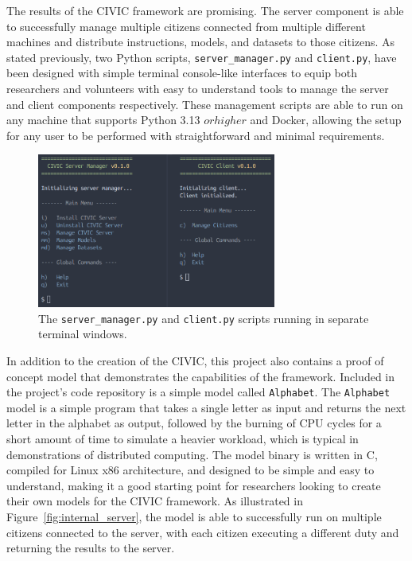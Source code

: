 \documentclass[11pt]{article}
\begin{document}
The results of the CIVIC framework are promising. The server component is able to successfully manage multiple citizens connected from multiple different machines and distribute instructions, models, and datasets to those citizens. As stated previously, two Python scripts, \verb|server_manager.py| and \verb|client.py|, have been designed with simple terminal console-like interfaces to equip both researchers and volunteers with easy to understand tools to manage the server and client components respectively. These management scripts are able to run on any machine that supports Python 3.13 \(or higher\) and Docker, allowing the setup for any user to be performed with straightforward and minimal requirements.

\begin{figure}[h]
    \centering
    \includegraphics[width=0.7\textwidth]{./figures/terminals.png}
    \caption{\small The \texttt{server\_manager.py} and \texttt{client.py} scripts running in separate terminal windows.}\label{fig:terminals}
\end{figure}

In addition to the creation of the CIVIC, this project also contains a proof of concept model that demonstrates the capabilities of the framework. Included in the project's code repository is a simple model called \verb|Alphabet|. The \verb|Alphabet| model is a simple program that takes a single letter as input and returns the next letter in the alphabet as output, followed by the burning of CPU cycles for a short amount of time to simulate a heavier workload, which is typical in demonstrations of distributed computing. The model binary is written in C, compiled for Linux x86 architecture, and designed to be simple and easy to understand, making it a good starting point for researchers looking to create their own models for the CIVIC framework. As illustrated in Figure~\ref{fig:internal_server}, the model is able to successfully run on multiple citizens connected to the server, with each citizen executing a different duty and returning the results to the server. 
\end{document}
